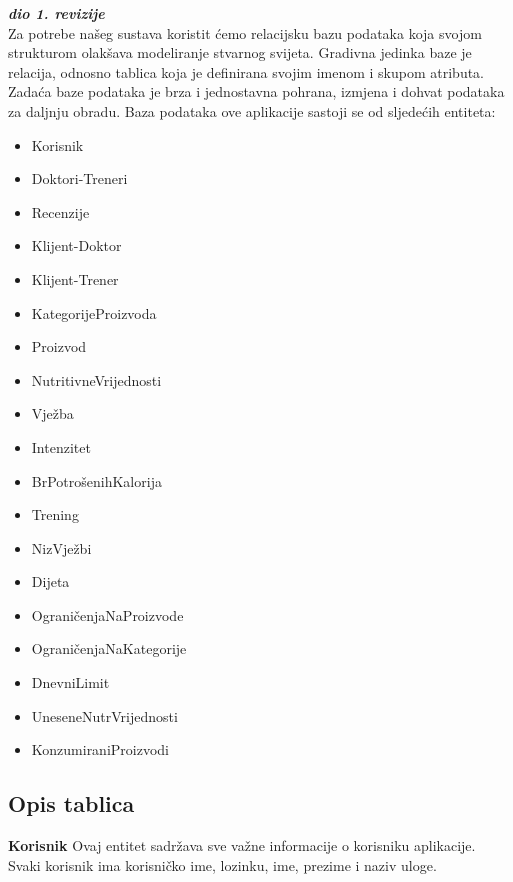 			\textbf{\textit{dio 1. revizije}}\\
			Za potrebe našeg sustava koristit ćemo relacijsku bazu podataka koja svojom strukturom olakšava modeliranje stvarnog svijeta. Gradivna jedinka baze je relacija, odnosno tablica koja je definirana svojim imenom i skupom atributa. Zadaća baze podataka je brza i jednostavna pohrana, izmjena i dohvat podataka za daljnju obradu.
			Baza podataka ove aplikacije sastoji se od sljedećih entiteta:
			\begin{itemize}
				\item {Korisnik}
				\item {Doktori-Treneri}
				\item {Recenzije}
				\item {Klijent-Doktor}
				\item {Klijent-Trener}
				\item {KategorijeProizvoda}
				\item {Proizvod}
				\item {NutritivneVrijednosti}
				\item {Vježba}
				\item {Intenzitet}
				\item {BrPotrošenihKalorija}
				\item {Trening}
				\item {NizVježbi}
				\item {Dijeta}
				\item {OgraničenjaNaProizvode}
				\item {OgraničenjaNaKategorije}
				\item {DnevniLimit}
				\item {UneseneNutrVrijednosti}
				\item {KonzumiraniProizvodi}
			\end{itemize}
			
			
		
			\subsection{Opis tablica}
			

				\textbf{Korisnik} Ovaj entitet sadržava sve važne informacije o korisniku aplikacije. Svaki korisnik ima korisničko ime, lozinku, ime, prezime i naziv uloge. 
				
				
				
